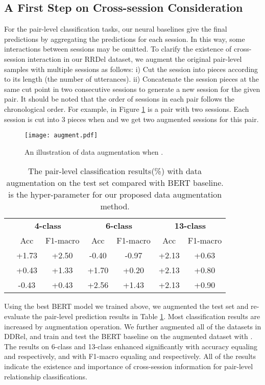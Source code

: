 \documentclass[letterpaper]{article} \usepackage{aaai21}  \usepackage{times}  \usepackage{helvet} \usepackage{courier}  \usepackage[hyphens]{url}  \usepackage{graphicx} \usepackage{xcolor}
\begin{document}
\subsection{A First Step on Cross-session Consideration}
\label{sec:cross}

For the pair-level classification tasks, our neural baselines give the final predictions by aggregating the predictions for each session. In this way, some interactions between sessions may be omitted. To clarify the existence of cross-session interaction in our RRDel dataset, we augment the original pair-level samples with multiple sessions as follows: i) Cut the session into  pieces according to its length (the number of utterances). ii) Concatenate the session pieces at the same cut point in two consecutive sessions to generate a new session for the given pair. It should be noted that the order of sessions in each pair follows the chronological order. For example, in Figure \ref{fig:augment} is a pair with two sessions. Each session is cut into 3 pieces when  and we get two augmented sessions for this pair.
\begin{figure}[t!]
	\centering
	\texttt{[image: augment.pdf]}
	\caption{An illustration of data augmentation when . }
	\label{fig:augment}
\end{figure}


\begin{table}[th]
	\centering
	\scriptsize
	\begin{tabular}{@{}lcccccc@{}}
		\toprule[1.5pt]
		& \multicolumn{2}{c}{\textbf{4-class}} & \multicolumn{2}{c}{\textbf{6-class}} & \multicolumn{2}{c}{\textbf{13-class}} \\ 
		& Acc & F1-macro                 & Acc & F1-macro                  & Acc & F1-macro \\
		\midrule
   &+1.73 &+2.50  &-0.40& -0.97& +2.13 & +0.63 \\		
		    &+0.43 &+1.33 &+1.70 &+0.20 &+2.13 &+0.80 \\
		    &-0.43 &+0.43 &+2.56 &+1.43 &+2.13 &+0.90 \\
		\bottomrule[1.5pt]
		
	\end{tabular}
	\caption{The pair-level classification results(\%) with data augmentation on the test set compared with BERT baseline.  is the hyper-parameter for our proposed data augmentation method.}
	\label{tab:cross}
\end{table}

Using the best BERT model we trained above, we augmented the test set and re-evaluate the pair-level prediction results in Table \ref{tab:cross}. Most classification results are increased by augmentation operation. We further augmented all of the datasets in DDRel, and train and test the BERT baseline on the augmented dataset with . The results on 6-class and 13-class enhanced significantly with accuracy equaling  and  respectively, and with F1-macro equaling   and  respectively. All of the results indicate the existence and importance of cross-session information for pair-level relationship classifications.
\end{document}
